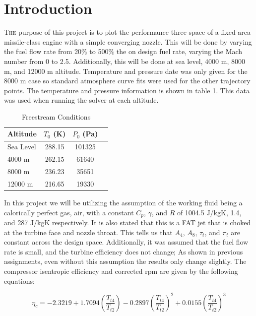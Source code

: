 \documentclass[journal ]{new-aiaa}
\begin{document}
\section{Introduction}
\lettrine{T}{he} purpose of this project is to plot the performance three space of a fixed-area missile-class engine with a simple converging nozzle.
This will be done by varying the fuel flow rate from 20$\% $ to 500$\% $ the on design fuel rate, varying the Mach number from 0 to 2.5.
Additionally, this will be done at sea level, 4000 m, 8000 m, and 12000 m altitude. 
Temperature and pressure date was only given for the 8000 m case so standard atmosphere curve fits were used for the other trajectory points.
The temperature and pressure information is shown in table \ref{tab:table0}. This data was used when running the solver at each altitude.

\begin{table}[hbt!]
    \caption{\label{tab:table0} Freestream  Conditions}
    \centering
    \begin{tabular}{lccc}
    \hline
    Altitude& $T_0$ (K)& $P_0$ (Pa)\\ \hline
    Sea Level &        288.15&       101325\\     
    4000 m &         262.15&            61640\\  
    8000 m &     236.23&          35651\\ 
    12000 m&  216.65&      19330\\ 
    \hline
    \end{tabular}
    \end{table}         
    
In this project we will be utilizing the assumption of the working fluid being a calorically perfect gas, air, with a constant $C_p$, $\gamma$, and $R$ of 1004.5 J/kgK, 1.4, and 287 J/kgK respectively.
It is also stated that this is a FAT jet that is choked at the turbine face and nozzle throat. This tells us that $A_4$, $A_8$, $\tau_t$, and $\pi_t$ are constant across the design space.
Additionally, it was assumed that the fuel flow rate is small, and the turbine efficiency does not change; As shown in previous assignments, even without this assumption the results only change slightly. The compressor isentropic efficiency and corrected rpm are given by the following equations:

\begin{equation}
    \eta_c = 
    -2.3219 + 1.7094 \left(\frac{T_{t4}}{T_{t2}}\right)  -0.2897 \left(\frac{T_{t4}}{T_{t2}}\right)^2 + 0.0155 \left(\frac{T_{t4}}{T_{t2}}\right)^3
\end{equation}
\end{document}

